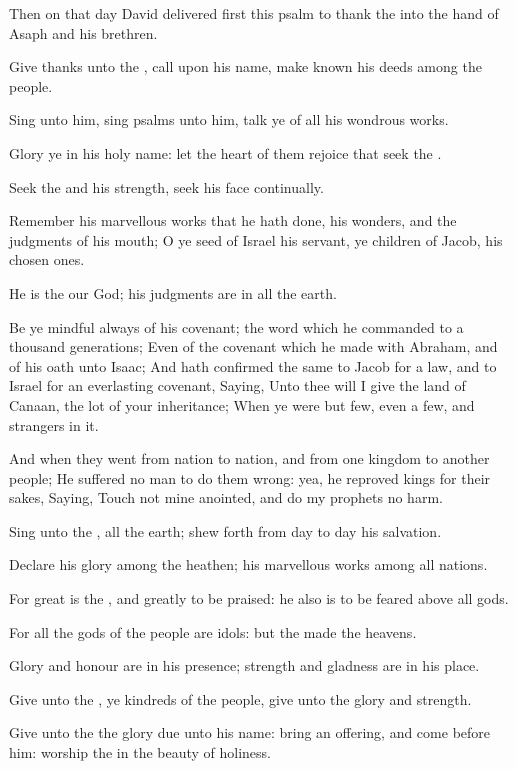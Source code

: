\verse Then on that day David delivered first this psalm to thank the \LORD into the hand of Asaph and his brethren.

\verse Give thanks unto the \LORD, call upon his name, make known his deeds among the people.

\verse Sing unto him, sing psalms unto him, talk ye of all his wondrous works.

\verse Glory ye in his holy name: let the heart of them rejoice that seek the \LORD.

\verse Seek the \LORD and his strength, seek his face continually.

\verse Remember his marvellous works that he hath done, his wonders, and the judgments of his mouth; \verse O ye seed of Israel his servant, ye children of Jacob, his chosen ones.

\verse He is the \LORD our God; his judgments are in all the earth.

\verse Be ye mindful always of his covenant; the word which he commanded to a thousand generations; \verse Even of the covenant which he made with Abraham, and of his oath unto Isaac; \verse And hath confirmed the same to Jacob for a law, and to Israel for an everlasting covenant, \verse Saying, Unto thee will I give the land of Canaan, the lot of your inheritance; \verse When ye were but few, even a few, and strangers in it.

\verse And when they went from nation to nation, and from one kingdom to another people; \verse He suffered no man to do them wrong: yea, he reproved kings for their sakes, \verse Saying, Touch not mine anointed, and do my prophets no harm.

\verse Sing unto the \LORD, all the earth; shew forth from day to day his salvation.

\verse Declare his glory among the heathen; his marvellous works among all nations.

\verse For great is the \LORD, and greatly to be praised: he also is to be feared above all gods.

\verse For all the gods of the people are idols: but the \LORD made the heavens.

\verse Glory and honour are in his presence; strength and gladness are in his place.

\verse Give unto the \LORD, ye kindreds of the people, give unto the \LORD glory and strength.

\verse Give unto the \LORD the glory due unto his name: bring an offering, and come before him: worship the \LORD in the beauty of holiness.

